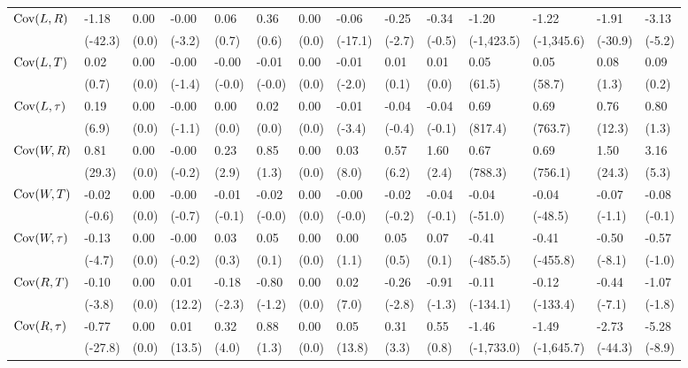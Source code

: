 {\begin{tabular}{@{}w{l}{6em}*{13}{w{c}{3em}}@{}}
    \quad $\mathrm{Cov}(L, R)$ & -1.18 & 0.00 & -0.00 & 0.06 & 0.36 & 0.00 & -0.06 & -0.25 & -0.34 & -1.20 & -1.22 & -1.91 & -3.13 \\
    & (-42.3) & (0.0) & (-3.2) & (0.7) & (0.6) & (0.0) & (-17.1) & (-2.7) & (-0.5) & (-1,423.5) & (-1,345.6) & (-30.9) & (-5.2) \\
    \quad $\mathrm{Cov}(L, T)$ & 0.02 & 0.00 & -0.00 & -0.00 & -0.01 & 0.00 & -0.01 & 0.01 & 0.01 & 0.05 & 0.05 & 0.08 & 0.09 \\
    & (0.7) & (0.0) & (-1.4) & (-0.0) & (-0.0) & (0.0) & (-2.0) & (0.1) & (0.0) & (61.5) & (58.7) & (1.3) & (0.2) \\
    \quad $\mathrm{Cov}(L, \tau)$ & 0.19 & 0.00 & -0.00 & 0.00 & 0.02 & 0.00 & -0.01 & -0.04 & -0.04 & 0.69 & 0.69 & 0.76 & 0.80 \\
    & (6.9) & (0.0) & (-1.1) & (0.0) & (0.0) & (0.0) & (-3.4) & (-0.4) & (-0.1) & (817.4) & (763.7) & (12.3) & (1.3) \\
    \quad $\mathrm{Cov}(W, R)$ & 0.81 & 0.00 & -0.00 & 0.23 & 0.85 & 0.00 & 0.03 & 0.57 & 1.60 & 0.67 & 0.69 & 1.50 & 3.16 \\
    & (29.3) & (0.0) & (-0.2) & (2.9) & (1.3) & (0.0) & (8.0) & (6.2) & (2.4) & (788.3) & (756.1) & (24.3) & (5.3) \\
    \quad $\mathrm{Cov}(W, T)$ & -0.02 & 0.00 & -0.00 & -0.01 & -0.02 & 0.00 & -0.00 & -0.02 & -0.04 & -0.04 & -0.04 & -0.07 & -0.08 \\
    & (-0.6) & (0.0) & (-0.7) & (-0.1) & (-0.0) & (0.0) & (-0.0) & (-0.2) & (-0.1) & (-51.0) & (-48.5) & (-1.1) & (-0.1) \\
    \quad $\mathrm{Cov}(W, \tau)$ & -0.13 & 0.00 & -0.00 & 0.03 & 0.05 & 0.00 & 0.00 & 0.05 & 0.07 & -0.41 & -0.41 & -0.50 & -0.57 \\
    & (-4.7) & (0.0) & (-0.2) & (0.3) & (0.1) & (0.0) & (1.1) & (0.5) & (0.1) & (-485.5) & (-455.8) & (-8.1) & (-1.0) \\
    \quad $\mathrm{Cov}(R, T)$ & -0.10 & 0.00 & 0.01 & -0.18 & -0.80 & 0.00 & 0.02 & -0.26 & -0.91 & -0.11 & -0.12 & -0.44 & -1.07 \\
    & (-3.8) & (0.0) & (12.2) & (-2.3) & (-1.2) & (0.0) & (7.0) & (-2.8) & (-1.3) & (-134.1) & (-133.4) & (-7.1) & (-1.8) \\
    \quad $\mathrm{Cov}(R, \tau)$ & -0.77 & 0.00 & 0.01 & 0.32 & 0.88 & 0.00 & 0.05 & 0.31 & 0.55 & -1.46 & -1.49 & -2.73 & -5.28 \\
    & (-27.8) & (0.0) & (13.5) & (4.0) & (1.3) & (0.0) & (13.8) & (3.3) & (0.8) & (-1,733.0) & (-1,645.7) & (-44.3) & (-8.9) \\

\end{tabular}}
